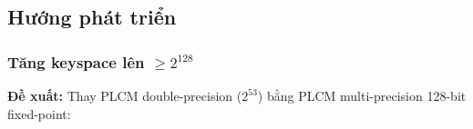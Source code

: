 \subsection{Hướng phát triển}

\subsubsection{Tăng keyspace lên $\geq 2^{128}$}

\textbf{Đề xuất:} Thay PLCM double-precision ($2^{53}$) bằng PLCM multi-precision
128-bit fixed-point:


